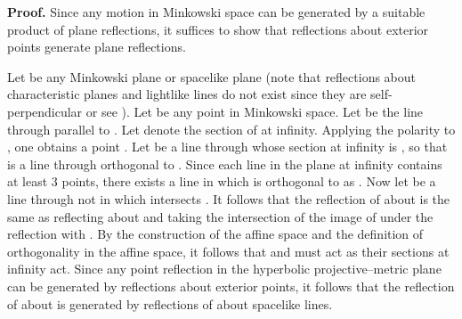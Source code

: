 \documentclass[a4paper,twoside,12pt]{article}
\newenvironment{proof}{\medskip \noindent 
            {\bf Proof.}}{ \hfill \myHighlight{$\square$}\coordHE{} \medskip}
\begin{document}
\begin{proof} Since any motion in Minkowski space can be generated by a
suitable product of plane reflections, it suffices to show that reflections
about exterior points generate plane reflections.

     Let \myHighlight{$\alpha$}\coordHE{} be any Minkowski plane or spacelike plane (note that
reflections about characteristic planes and lightlike lines do not exist
since they are self-perpendicular or see \cite{BK}). Let \coordHE{} be any point in
Minkowski space. Let \coordHE{} be the line through \coordHE{} parallel to \myHighlight{$\alpha$}\coordHE{}.
Let \myHighlight{$\alpha_{\infty }$}\coordHE{} denote the section of \myHighlight{$\alpha$}\coordHE{} at infinity.
Applying the polarity to \myHighlight{$\alpha_{\infty }$}\coordHE{}, one obtains a point 
\coordHE{}. Let \coordHE{} be a line through \coordHE{} whose 
section at infinity is \coordHE{}, so that \coordHE{} is a line through \coordHE{}
orthogonal to \myHighlight{$\alpha$}\coordHE{}. Since each line in the plane at infinity contains
at least 3 points, there exists a line \coordHE{} in \myHighlight{$\alpha$}\coordHE{} which is
orthogonal to \coordHE{} as \coordHE{}. Now let 
\coordHE{} be a line through \coordHE{} not in \myHighlight{$\alpha$}\coordHE{} which intersects \coordHE{}. It
follows that the reflection of \coordHE{} about \myHighlight{$\alpha$}\coordHE{} is the same as
reflecting \coordHE{} about \coordHE{} and taking the intersection of the image of \coordHE{}
under the reflection with \coordHE{}. By the construction of the affine space and
the definition of orthogonality in the affine space, it follows that \coordHE{} and 
\coordHE{} must act as their sections at infinity act. Since any point reflection
in the hyperbolic projective--metric plane can be generated by reflections
about exterior points, it follows that the reflection of \coordHE{} about \myHighlight{$\alpha$}\coordHE{}
is generated by reflections of \coordHE{} about spacelike lines.
\end{proof}
\end{document}
